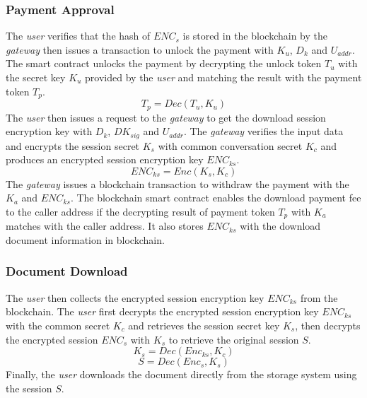 \subsubsection{Payment Approval}
The {\it user} verifies that the hash of $ENC_s$ is stored in the blockchain by the {\it gateway} then issues a transaction to unlock the payment with $K_u$, $D_k$ and $U_{addr}$. The smart contract unlocks the payment by decrypting the unlock token $T_u$ with the secret key $K_u$ provided by the {\it user} and matching the result with the payment token $T_p$. 
\begin{equation}
\label{eq-d-6} 
T_p = Dec (T_u, K_u)
\end{equation}
The {\it user} then issues a request to the {\it gateway} to get the download session encryption key with $D_k$, $DK_{sig}$ and $U_{addr}$. The {\it gateway} verifies the input data and encrypts the session secret $K_s$ with common conversation secret $K_c$ and produces an encrypted session encryption key $ENC_{ks}$.
\begin{equation}
\label{eq-d-7} 
ENC_{ks} = Enc (K_s, K_c)
\end{equation}
The {\it gateway} issues a blockchain transaction to withdraw the payment with the $K_a$ and $ENC_{ks}$. The blockchain smart contract enables the download payment fee to the caller address if the decrypting result of payment token $T_p$ with $K_a$ matches with the caller address. It also stores $ENC_{ks}$ with the download document information in blockchain.

\subsubsection{Document Download}
The {\it user} then collects the encrypted session encryption key $ENC_{ks}$ from the blockchain. The {\it user} first decrypts the encrypted session encryption key $ENC_{ks}$ with the common secret $K_c$ and retrieves the session secret key $K_s$, then decrypts the encrypted session $ENC_s$ with $K_s$ to retrieve the original session $S$.
\begin{equation}
\label{eq-d-8} 
K_s = Dec (Enc_{ks}, K_c)
\end{equation}
\begin{equation}
\label{eq-d-9} 
S = Dec (Enc_s, K_s)
\end{equation}
Finally, the {\it user} downloads the document directly from the storage system using the session $S$.


